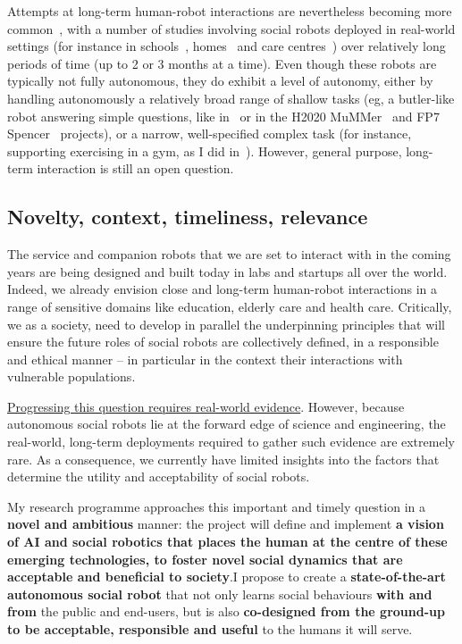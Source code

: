 Attempts at long-term human-robot interactions are nevertheless becoming more
common~\parencite{kunze2018artificial,leite2013social}, with a number of studies
involving social robots deployed in real-world settings (for instance in
schools~\parencite{leite2014empathic,westlund2017measuring,
lemaignan2016learning,coninx2016towards}, homes~\parencite{degraaf2017phased} and
care centres~\parencite{hawes2017strands,winkle2020couch}) over relatively long
periods of time (up to 2 or 3 months at a time). Even though these robots are
typically not fully autonomous, they do exhibit a level of autonomy, either by
handling autonomously a relatively broad range of shallow tasks (eg, a
butler-like robot answering simple questions, like in~\parencite{hawes2017strands} or
in the H2020 MuMMer~\parencite{heikkila2018can} and FP7
Spencer~\parencite{triebel2016spencer} projects), or a narrow, well-specified complex
task (for instance, supporting exercising in a gym, as I did in~\parencite{winkle2020couch}).
However, general purpose, long-term interaction is still an open question.


\subsection{Novelty, context, timeliness, relevance}

The service and companion robots that we are set to interact with in the coming
years are being designed and built today in labs and startups all over the
world. Indeed, we already envision close and long-term human-robot interactions
in a range of sensitive domains like education, elderly care and health care.
Critically, we as a society, need to develop in parallel the underpinning
principles that will ensure the future roles of social robots are collectively
defined, in a responsible and ethical manner -- in particular in the context
their interactions with vulnerable populations.

\ul{Progressing this question requires real-world evidence}. However, because
autonomous social robots lie at the forward edge of science and engineering, the
real-world, long-term deployments required to gather such evidence are extremely
rare. As a consequence, we currently have limited insights into the factors that
determine the utility and acceptability of social robots.

My research programme approaches this important and timely question in a \textbf{novel and
ambitious} manner: the project will define and implement \textbf{a vision of AI
and social robotics that places the human at the centre of these emerging
technologies, to foster novel social dynamics that are acceptable and beneficial
to society}.I propose to create a \textbf{state-of-the-art autonomous social
robot} that not only learns social behaviours \textbf{with and from} the public
and end-users, but is also \textbf{co-designed from the ground-up to be
acceptable, responsible and useful} to the humans it will serve.

